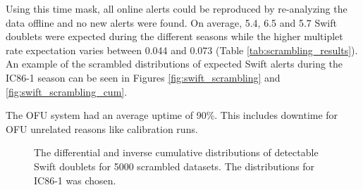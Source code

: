 Using this time mask, all online alerts could be reproduced by re-analyzing the 
data offline and no new alerts were found. On average, 5.4, 6.5 and 5.7 Swift 
doublets were expected during the different seasons while the higher multiplet 
rate expectation varies between 0.044 and 0.073 (Table 
\ref{tab:scrambling_results}). An example of the scrambled distributions of 
expected Swift alerts during the IC86-1 season can be seen in Figures
\ref{fig:swift_scrambling} and \ref{fig:swift_scrambling_cum}.

The OFU system had an average uptime of 90\%. 
This includes downtime for OFU unrelated reasons like calibration runs.

\begin{figure}[h]
\centering
 \captionsetup{width=.9\textwidth}
\caption{The differential and inverse cumulative distributions of 
detectable Swift doublets for 5000 scrambled datasets. The distributions for 
IC86-1 was chosen.}
\end{figure}



